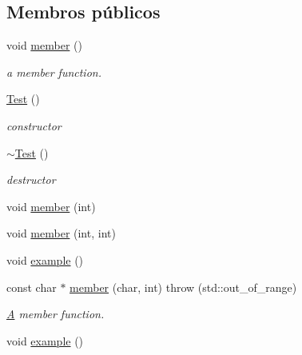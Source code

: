 \subsection*{Membros públicos}
\begin{DoxyCompactItemize}
\item 
\hypertarget{class_test_a596dd7e8230777e2e65779e0da29177b}{void \hyperlink{class_test_a596dd7e8230777e2e65779e0da29177b}{member} ()}\label{class_test_a596dd7e8230777e2e65779e0da29177b}

\begin{DoxyCompactList}\small\item\em a member function. \end{DoxyCompactList}\item 
\hyperlink{class_test_a350e5417b9f48c2f7b98937514b03da2}{Test} ()
\begin{DoxyCompactList}\small\item\em constructor \end{DoxyCompactList}\item 
\hyperlink{class_test_a6fba67d17f23fe2f810e5f79f4e91538}{$\sim$\-Test} ()
\begin{DoxyCompactList}\small\item\em destructor \end{DoxyCompactList}\item 
void \hyperlink{class_test_a3b57d2ff9a1488b8e434478eb77e7846}{member} (int)
\item 
void \hyperlink{class_test_afbb46725b4cc672dbf7b52051ec6df8d}{member} (int, int)
\item 
void \hyperlink{class_test_afa2b50f4716fc3b42221a72e676e1422}{example} ()
\item 
const char $\ast$ \hyperlink{class_test_ac2e7badca1267f289b96035d067b4bc1}{member} (char, int)  throw (std\-::out\-\_\-of\-\_\-range)
\begin{DoxyCompactList}\small\item\em \hyperlink{class_a}{A} member function. \end{DoxyCompactList}\item 
\hypertarget{class_test_afa2b50f4716fc3b42221a72e676e1422}{void \hyperlink{class_test_afa2b50f4716fc3b42221a72e676e1422}{example} ()}\label{class_test_afa2b50f4716fc3b42221a72e676e1422}


\end{DoxyCompactItemize}
